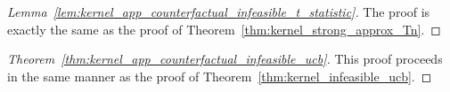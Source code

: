 \begin{proof}[Lemma~\ref{lem:kernel_app_counterfactual_infeasible_t_statistic}]
  The proof is exactly the same as the proof of
  Theorem~\ref{thm:kernel_strong_approx_Tn}.
\end{proof}

\begin{proof}[Theorem~\ref{thm:kernel_app_counterfactual_infeasible_ucb}]
  This proof proceeds in the same manner as the proof of
  Theorem~\ref{thm:kernel_infeasible_ucb}.
\end{proof}
